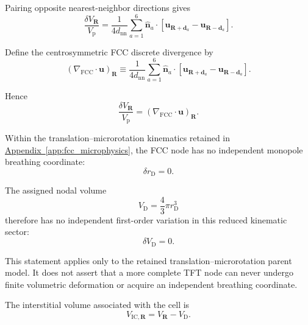 Pairing opposite nearest-neighbor directions gives
\begin{equation}
    \frac{\delta V_{\mathbf{R}}}{V_{\mathrm{p}}}
    =
    \frac{1}{4d_{\mathrm{nn}}}
    \sum_{a=1}^{6}
    \hat{\mathbf{n}}_a
    \cdot
    \left[
        \mathbf{u}_{\mathbf{R}+\mathbf{d}_a}
        -
        \mathbf{u}_{\mathbf{R}-\mathbf{d}_a}
    \right].
\end{equation}

Define the centrosymmetric FCC discrete divergence by
\begin{equation}
    \boxed{
    \left(
        \nabla_{\mathrm{FCC}}
        \cdot
        \mathbf{u}
    \right)_{\mathbf{R}}
    \equiv
    \frac{1}{4d_{\mathrm{nn}}}
    \sum_{a=1}^{6}
    \hat{\mathbf{n}}_a
    \cdot
    \left[
        \mathbf{u}_{\mathbf{R}+\mathbf{d}_a}
        -
        \mathbf{u}_{\mathbf{R}-\mathbf{d}_a}
    \right].
    }
\end{equation}

Hence
\begin{equation}
    \frac{\delta V_{\mathbf{R}}}{V_{\mathrm{p}}}
    =
    \left(
        \nabla_{\mathrm{FCC}}
        \cdot
        \mathbf{u}
    \right)_{\mathbf{R}}.
\end{equation}

Within the translation--microrotation kinematics retained in \hyperref[app:fcc_microphysics]{Appendix~\ref*{app:fcc_microphysics}}, the FCC node has no independent monopole breathing coordinate:
\begin{equation}
    \delta r_{\mathrm{D}}=0.
\end{equation}

The assigned nodal volume
\begin{equation}
    V_{\mathrm{D}}
    =
    \frac{4}{3}\pi r_{\mathrm{D}}^3
\end{equation}
therefore has no independent first-order variation in this reduced kinematic sector:
\begin{equation}
    \delta V_{\mathrm{D}}=0.
\end{equation}

This statement applies only to the retained translation--microrotation parent model. It does not assert that a more complete TFT node can never undergo finite volumetric deformation or acquire an independent breathing coordinate.

The interstitial volume associated with the cell is
\begin{equation}
    V_{\mathrm{IC},\mathbf{R}}
    =
    V_{\mathbf{R}}
    -
    V_{\mathrm{D}}.
\end{equation}

